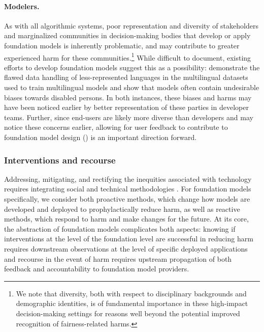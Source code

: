 \paragraph{Modelers.}
As with all algorithmic systems, poor representation and diversity of stakeholders and marginalized communities in decision-making bodies that develop or apply foundation models is inherently problematic, and may contribute to greater experienced harm for these communities.\footnote{We note that diversity, both with respect to disciplinary backgrounds and demographic identities, is of fundamental importance in these high-impact decision-making settings for reasons well beyond the potential improved recognition of fairness-related harms.} 
While difficult to document, existing efforts to develop foundation models suggest this as a possibility: 
\citet{caswell2021} demonstrate the flawed data handling of less-represented languages in the multilingual datasets used to train multilingual models and \citet{hutchinson2020} show that models often contain undesirable biases towards disabled persons. 
In both instances, these biases and harms may have been noticed earlier by better representation of these parties in developer teams. 
Further, since end-users are likely more diverse than developers and may notice these concerns earlier, allowing for user feedback to contribute to foundation model design () is an important direction forward.

\subsubsection{Interventions and recourse}
\label{sec:fairness-recourse}

Addressing, mitigating, and rectifying the inequities associated with technology requires  integrating social and technical methodologies \citep{Abebe2020}.
 For foundation models specifically, we consider both proactive methods, which change how models are developed and deployed to prophylactically reduce harm, as well as reactive methods, which respond to harm and make changes for the future.
 At its core, the abstraction of foundation models complicates both aspects: knowing if interventions at the level of the foundation level are successful in reducing harm requires downstream observations at the level of specific deployed applications and recourse in the event of harm requires upstream propagation of both feedback and accountability to foundation model providers.
 

